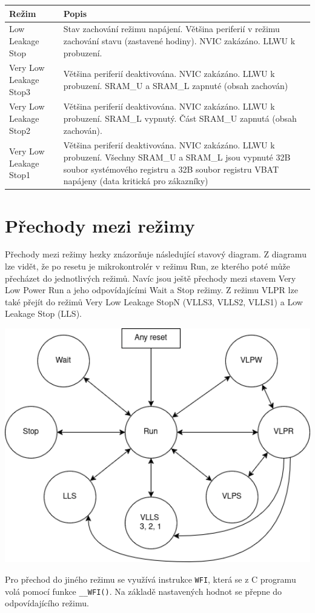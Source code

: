 \documentclass{article}
\begin{document}
\begin{tabularx}{\textwidth}{|>{\centering\arraybackslash}p{}|X|}
    \hline
    \textbf{Režim} & \textbf{Popis} \\
    \hline
    Low Leakage Stop & Stav zachování režimu napájení. Většina periferií v
    režimu zachování stavu (zastavené hodiny). NVIC zakázáno. LLWU k probuzení.
    \\
    \hline
    Very Low Leakage Stop3 & Většina periferií deaktivována. NVIC zakázáno.
    LLWU k probuzení. SRAM\_U a SRAM\_L zapnuté (obsah zachován) \\
    \hline
    Very Low Leakage Stop2 & Většina periferií deaktivována. NVIC zakázáno.
    LLWU k probuzení. SRAM\_L vypnutý. Část SRAM\_U zapnutá (obsah zachován). \\
    \hline
    Very Low Leakage Stop1 & Většina periferií deaktivována. NVIC zakázáno.
    LLWU k probuzení. Všechny SRAM\_U a SRAM\_L jsou vypnuté 32B soubor
    systémového registru a 32B soubor registru VBAT napájeny (data kritická
    pro zákazníky) \\
    \hline
\end{tabularx}

\newpage

\section{Přechody mezi režimy}

Přechody mezi režimy hezky znázorňuje následující stavový diagram. Z diagramu
lze vidět, že po resetu je mikrokontrolér v režimu Run, ze kterého poté může
přecházet do jednotlivých režimů. Navíc jsou ještě přechody mezi stavem Very
Low Power Run a jeho odpovídajícími Wait a Stop režimy. Z režimu VLPR lze také
přejít do režimů Very Low Leakage StopN (VLLS3, VLLS2, VLLS1) a Low Leakage
Stop (LLS).

\includegraphics[width=1.0\textwidth]{power-modes.png}

Pro přechod do jiného režimu se využívá instrukce \texttt{WFI}, která se z C
programu volá pomocí funkce \texttt{__WFI()}. Na základě nastavených hodnot
se přepne do odpovídajícího režimu.
\end{document}

